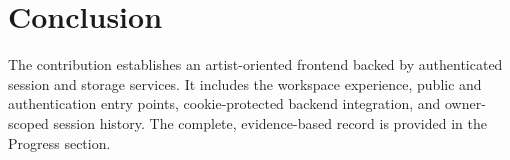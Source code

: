 \section{Conclusion}
The contribution establishes an artist-oriented frontend backed by authenticated session and storage services. It includes the workspace experience, public and authentication entry points, cookie-protected backend integration, and owner-scoped session history. The complete, evidence-based record is provided in the Progress section.
